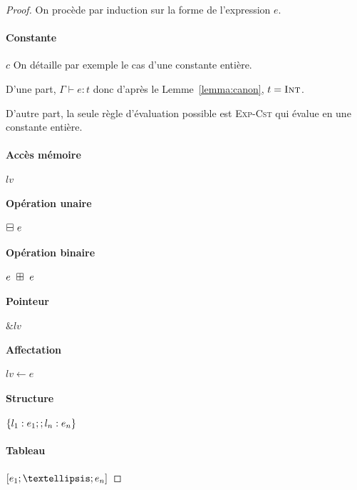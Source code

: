\begin{proof}

On procède par induction sur la forme de l'expression $e$.

\paragraph{ Constante }             $c$ %
On détaille par exemple le cas d'une constante entière.

D'une part, $Γ ⊢ e : t$ donc d'après le Lemme~\ref{lemma:canon}, $t = \textsc{Int}$.

D'autre part, la seule règle d'évaluation possible est \textsc{Exp-Cst} qui
évalue en une constante entière.


\paragraph{ Accès mémoire }         $ lv $ %

\paragraph{ Opération unaire }      $ \boxminus~e $ %


\paragraph{ Opération binaire }     $ e~\boxplus~e $ %

\paragraph{ Pointeur }              $ \& lv $ %

\paragraph{ Affectation }           $ lv ← e $ %

\paragraph{ Structure }             $ \{ l_1 : e_1 ; ; l_n : e_n \} $ %

\paragraph{ Tableau }               $ \eArray{e_1 ;…; e_n} $ %


\end{proof}
